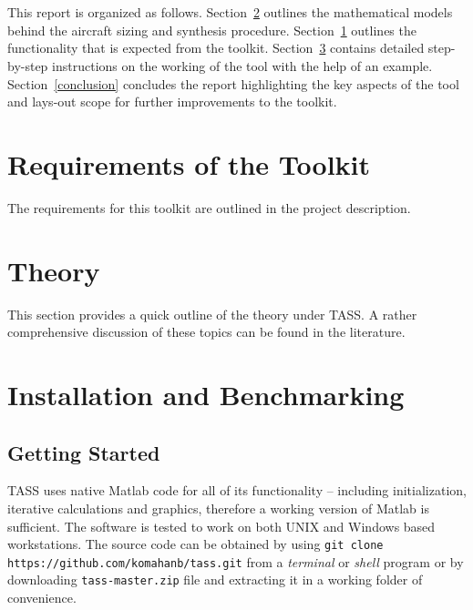 \documentclass[pdftex,12pt,letter]{article}
\begin{document}
\\\\
This report is organized as follows. Section~\ref{theory} outlines the mathematical models behind the aircraft sizing and synthesis procedure. Section~\ref{requirements} outlines the functionality that is expected from the toolkit. Section~\ref{installandbenchmnark} contains detailed step-by-step instructions on the working of the tool with the help of an example. Section~\ref{conclusion} concludes the report highlighting the key aspects of the tool and lays-out scope for further improvements to the toolkit. 

\section{Requirements of the Toolkit}\label{requirements}
The requirements for this toolkit are outlined in the project description\cite{rpf}.

\section{Theory}\label{theory}

This section provides a quick outline of the theory under TASS. A rather comprehensive discussion of these topics can be found in the literature\cite{NicolaiText,FieldingText,HoweText,RaymerText}.

\section{Installation and Benchmarking}\label{installandbenchmnark}

\subsection{Getting Started}

TASS uses native Matlab code for all of its functionality -- including initialization, iterative calculations and graphics, therefore a working version of Matlab\cite{MATLAB} is sufficient. The software is tested to work on both UNIX and Windows based workstations. The source code can be obtained by using \texttt{git clone https://github.com/komahanb/tass.git} from a \textit{terminal} or \textit{shell} program or by downloading \texttt{tass-master.zip} file and extracting it in a working folder of convenience. 

\end{document}
